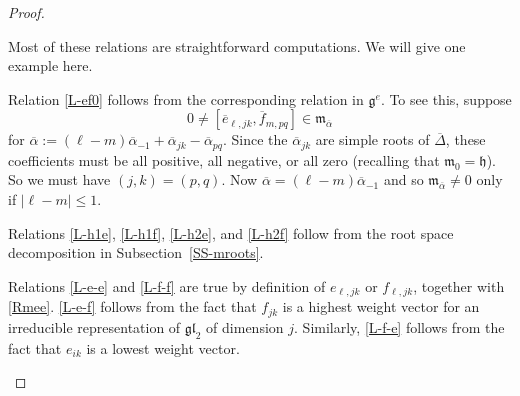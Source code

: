 \documentclass[11pt,letterpaper]{amsart}
\numberwithin{thecounter}{section}
\theoremstyle{definition}
\renewcommand{\a}{\alpha}
\newcommand{\e}{\overline{e}}
\newcommand{\f}{\overline{f}}
\begin{document}
\begin{proof}
\begin{shortver}
Most of these relations are straightforward computations. We will give one example here.
\end{shortver}

Relation \eqref{L-ef0} follows from the corresponding relation in $\mathfrak{g}^e$. To see this, 
suppose $$0\ne\left[\e_{\ell,jk},  \f_{m,pq} \right]\in\mathfrak{m}_{\overline\a}$$ for $\overline\a:=(\ell-m )\overline\alpha_{-1} + \overline\alpha_{jk} - \overline\alpha_{pq}$. 
Since the $\overline\alpha_{jk}$ are simple roots of $\overline\Delta$, these coefficients must be  all positive, all negative, or all zero (recalling that  $\mathfrak{m}_0=\mathfrak{h}$).
So we must have $(j,k)=(p,q)$. Now $\overline\a=(\ell-m )\overline\alpha_{-1}$ and so  $\mathfrak{m}_{\overline\a}\ne0$ only if $|\ell-m| \le 1$.
\begin{longver}

Relations \eqref{L-h1e}, \eqref{L-h1f}, \eqref{L-h2e}, and \eqref{L-h2f} follow from the root space decomposition in Subsection~\ref{SS-mroots}.

Relations \eqref{L-e-e} and \eqref{L-f-f} are true by definition of $e_{\ell,jk}$ or $f_{\ell,jk}$, together with \eqref{Rmee}.  \eqref{L-e-f} follows from the fact that  $f_{jk}$ is a highest weight vector for an irreducible representation of $\mathfrak {gl}_2$ of dimension $j$. Similarly, \eqref{L-f-e} follows from the fact that $e_{ik}$ is a lowest weight vector. 


\end{longver}
\end{proof}
\end{document}
